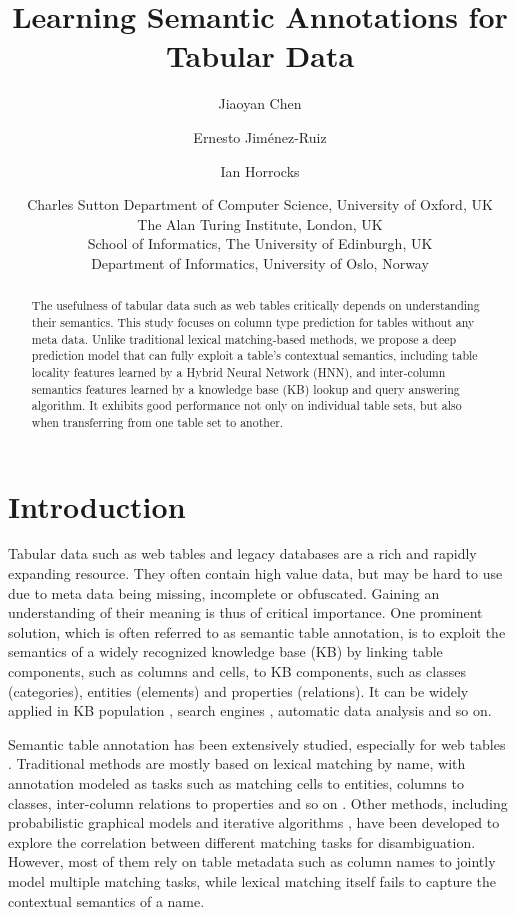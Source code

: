 \documentclass{article}
\title{
Learning Semantic Annotations for Tabular Data
}
\author{
Jiaoyan Chen \and Ernesto Jim\'enez-Ruiz \and Ian Horrocks \and Charles Sutton
\affiliations
Department of Computer Science, University of Oxford, UK\\
The Alan Turing Institute, London, UK\\
School of Informatics, The University of Edinburgh,  UK\\
Department of Informatics, University of Oslo, Norway
}
\begin{document}
\maketitle

\begin{abstract}
The usefulness of tabular data such as web tables critically depends on
understanding their semantics.
This study focuses on column type prediction for tables without any meta data.
Unlike traditional lexical matching-based methods,
we propose a deep prediction model that can fully exploit a table's contextual semantics,
including table locality features learned by a Hybrid Neural Network (HNN),
and inter-column semantics features learned by a knowledge base (KB) lookup and query answering algorithm.
It exhibits good performance not only on individual table sets, but also
when transferring from one table set to another.

\end{abstract}

\section{Introduction}
Tabular data such as web tables and legacy databases are a rich and rapidly expanding resource.
They often contain high value data,
but may be hard to use
due to meta data being missing, incomplete or obfuscated. 
Gaining an understanding of their meaning is thus of critical importance.
One prominent solution, 
which is often 
referred to 
as semantic table annotation,
is to exploit the semantics of a widely recognized 
knowledge base (KB)
by linking table components, such as columns and cells, to KB components, 
such as classes (categories), entities (elements) and properties (relations).
It can be widely applied in KB population \cite{ritze2016profiling}, search engines \cite{cafarella2008webtables,cafarella2018ten}, automatic data analysis \cite{thirumuruganathan2018data,chu2015katara} and so on.


Semantic table annotation has been extensively studied, especially for web tables \cite{cafarella2018ten}.
Traditional methods are mostly based on lexical matching by name, 
with annotation modeled as tasks such as matching cells to entities, columns to classes, inter-column relations to properties and so on \cite{limaye2010annotating}.
Other methods, including probabilistic graphical models \cite{bhagavatula2015tabel} and iterative algorithms \cite{ritze2015matching}, have been developed to explore the correlation between different matching tasks for disambiguation.
However, most of them rely on table metadata such as column names to jointly model multiple matching tasks,
while lexical matching itself fails to capture the contextual semantics of a name.
\end{document}
